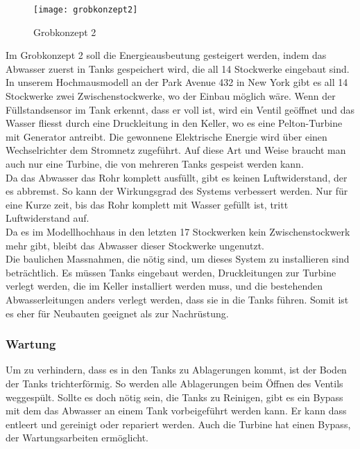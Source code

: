 \newpage
\begin{wrapfigure}{r}{0.5\textwidth}
  \begin{center}
    \texttt{[image: grobkonzept2]}
  \end{center}
  \caption{Grobkonzept 2}
\end{wrapfigure}
Im Grobkonzept 2 soll die Energieausbeutung gesteigert werden, indem das Abwasser zuerst in Tanks gespeichert wird, die all 14 Stockwerke eingebaut sind. In unserem Hochmausmodell an der Park Avenue 432 in New York gibt es all 14 Stockwerke zwei Zwischenstockwerke, wo der Einbau möglich wäre. Wenn der Füllstandsensor im Tank erkennt, dass er voll ist, wird ein Ventil geöffnet und das Wasser fliesst durch eine Druckleitung in den Keller, wo es eine Pelton-Turbine mit Generator antreibt. Die gewonnene Elektrische Energie wird über einen Wechselrichter dem Stromnetz zugeführt. Auf diese Art und Weise braucht man auch nur eine Turbine, die von mehreren Tanks gespeist werden kann.\\ 
Da das Abwasser das Rohr komplett ausfüllt, gibt es keinen Luftwiderstand, der es abbremst. So kann der Wirkungsgrad des Systems verbessert werden. Nur für eine Kurze zeit, bis das Rohr komplett mit Wasser gefüllt ist, tritt Luftwiderstand auf.\\
Da es im Modellhochhaus in den letzten 17 Stockwerken kein Zwischenstockwerk mehr gibt, bleibt das Abwasser dieser Stockwerke ungenutzt.\\
Die baulichen Massnahmen, die nötig sind, um dieses System zu installieren sind beträchtlich. Es müssen Tanks eingebaut werden, Druckleitungen zur Turbine verlegt werden, die im Keller installiert werden muss, und die bestehenden Abwasserleitungen anders verlegt werden, dass sie in die Tanks führen. Somit ist es eher für Neubauten geeignet als zur Nachrüstung.\\

\subsubsection{Wartung}
Um zu verhindern, dass es in den Tanks zu Ablagerungen kommt, ist der Boden der Tanks trichterförmig. So werden alle Ablagerungen beim Öffnen des Ventils weggespült. Sollte es doch nötig sein, die Tanks zu Reinigen, gibt es ein Bypass mit dem das Abwasser an einem Tank vorbeigeführt werden kann.\WFclear
Er kann dass entleert und gereinigt oder repariert werden. Auch die Turbine hat einen Bypass, der Wartungsarbeiten ermöglicht.


